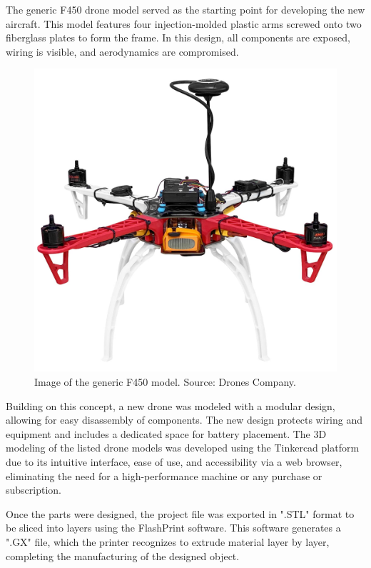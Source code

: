 \documentclass[conference]{IEEEtran}
\begin{document}
The generic F450 drone model served as the starting point for developing the new aircraft. This model features four injection-molded plastic arms screwed onto two fiberglass plates to form the frame. In this design, all components are exposed, wiring is visible, and aerodynamics are compromised.

\begin{figure}[!htb]
    \centering
    \includegraphics[scale=0.07]{img/f450.jpg} 
    \caption{Image of the generic F450 model. Source: Drones Company.}
    \label{fig:my_label}
\end{figure}

Building on this concept, a new drone was modeled with a modular design, allowing for easy disassembly of components. The new design protects wiring and equipment and includes a dedicated space for battery placement. The 3D modeling of the listed drone models was developed using the Tinkercad platform due to its intuitive interface, ease of use, and accessibility via a web browser, eliminating the need for a high-performance machine or any purchase or subscription.

Once the parts were designed, the project file was exported in ".STL" format to be sliced into layers using the FlashPrint software. This software generates a ".GX" file, which the printer recognizes to extrude material layer by layer, completing the manufacturing of the designed object.
\end{document}
